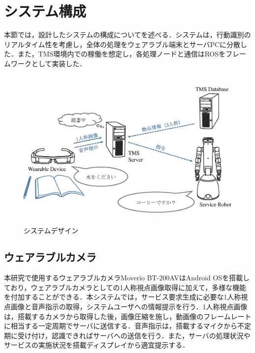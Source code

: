 \section{システム構成}
本節では，設計したシステムの構成についてを述べる．システムは，行動識別のリアルタイム性を考慮し，全体の処理をウェアラブル端末とサーバPCに分散した．また，TMS環境内での稼働を想定し，各処理ノードと通信はROSをフレームワークとして実装した．
%
\begin{figure}[htbp]
  \begin{center}
   \includegraphics[height=80mm]{figure/system_2.eps}
   \caption{システムデザイン}
   \label{fig:system_2}
  \end{center}
\end{figure}

\subsection{ウェアラブルカメラ}
本研究で使用するウェアラブルカメラMoverio BT-200AVはAndroid OSを搭載しており，ウェアラブルカメラとしての1人称視点画像取得に加えて，多様な機能を付加することができる．本システムでは，サービス要求生成に必要な1人称視点画像と音声指示の取得，システムユーザへの情報提示を行う．1人称視点画像は，搭載するカメラから取得した後，画像圧縮を施し，動画像のフレームレートに相当する一定周期でサーバに送信する．音声指示は，搭載するマイクから不定期に受け付け，認識できればサーバへの送信を行う．また，サーバの処理状況やサービスの実施状況を搭載ディスプレイから適宜提示する．

